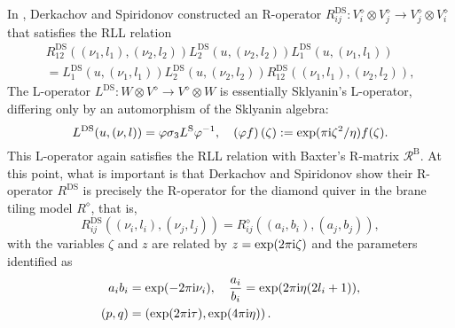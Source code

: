 In \cite{Derkachov:2012iv}, Derkachov and Spiridonov constructed
an R-operator $R_{ij}^{\mathrm{DS}}:V_{i}^{\diamond}\otimes V_{j}^{\diamond}\rightarrow V_{j}^{\diamond}\otimes V_{i}^{\diamond}$
that satisfies the RLL relation
\begin{multline}
    R_{12}^{\mathrm{DS}}((\nu_{1},l_{1}),(\nu_{2},l_{2}))
    L_{2}^{\mathrm{DS}}(u,(\nu_{2},l_{2}))
    L_{1}^{\mathrm{DS}}(u,(\nu_{1},l_{1}))    \\
      =
        L_{1}^{\mathrm{DS}}(u,(\nu_{1},l_{1}))
        L_{2}^{\mathrm{DS}}(u,(\nu_{2},l_{2}))
        R_{12}^{\mathrm{DS}}((\nu_{1},l_{1}),(\nu_{2},l_{2})),
\end{multline}
The L-operator $L^{\mathrm{DS}}:W\otimes V^{\diamond}\to V^{\diamond}\otimes W$
is essentially Sklyanin's L-operator, differing only by an automorphism
of the Sklyanin algebra:
\begin{equation}
    L^{\mathrm{DS}}(u,(\nu,l))
      =  \varphi  \sigma_{3}  L^{\mathrm{S}}\varphi^{-1},
        \quad  \left(\varphi f\right)(\zeta)  :=  \exp(\pi \mathrm{i} \zeta^{2}/\eta)f(\zeta).
\end{equation}
This L-operator again satisfies the RLL relation with Baxter's R-matrix
$\mathcal{R}^{\mathrm{B}}$. At this point, what is important is that
Derkachov and Spiridonov show their R-operator $R^{\mathrm{DS}}$ is precisely the R-operator
for the diamond quiver in the brane tiling model $R^{\diamond}$,
that is,
\begin{equation}
    R_{ij}^{\mathrm{DS}}((\nu_{i},l_{i}),(\nu_{j},l_{j}))
      =
        R_{ij}^{\diamond}((a_{i},b_{i}),(a_{j},b_{j})),
\end{equation}
with the variables $\zeta$ and $z$ are related by $z=\exp(2\pi \mathrm{i} \zeta)$
and the parameters identified as
\begin{align}
  a_{i} b_{i} &  =  \exp(-2\pi \mathrm{i} \nu_{i}),  \quad  \frac{a_{i}}{b_{i}}  =  \exp(2\pi \mathrm{i}\eta(2l_{i}+1)),  \\
  (p,q)       &  =  \left(\exp(2\pi \mathrm{i}\tau),\exp(4\pi \mathrm{i}\eta)\right).
\end{align}

